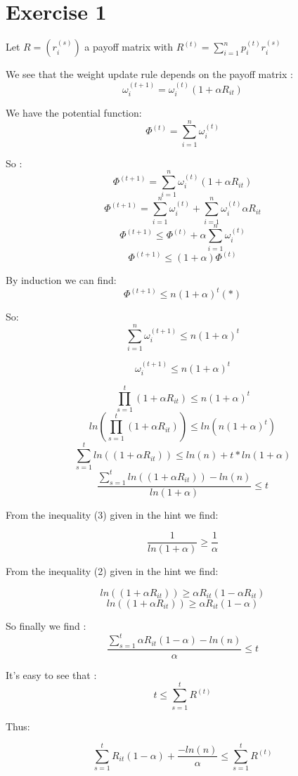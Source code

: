 \section*{Exercise 1}
Let $R=(r_{i}^{(s)})$ a payoff matrix with $R^{(t)}=\sum_{i=1}^{n}p_{i}^{(t)}r_{i}^{(s)}$

We see that the weight update rule depends on the payoff matrix :
\[\omega_{i}^{(t+1)}=\omega_{i}^{(t)}(1+\alpha R_{it})\]

We have the potential function: 
\[\Phi^{(t)}=\sum_{i=1}^{n}\omega _{i}^{(t)}\]

So : 
\[\Phi^{(t+1)}=\sum_{i=1}^{n}\omega _{i}^{(t)}(1+\alpha R_{it})\]
\[\Phi^{(t+1)}=\sum_{i=1}^{n}\omega _{i}^{(t)}+\sum_{i=1}^{n}\omega _{i}^{(t)}\alpha R_{it}\]
\[\Phi^{(t+1)}\leqslant \Phi^{(t)}+\alpha \sum_{i=1}^{n}\omega _{i}^{(t)}\]
\[\Phi^{(t+1)}\leqslant (1+\alpha )\Phi^{(t)}\]

By induction we can find:
\[\Phi^{(t+1)}\leqslant n(1+\alpha )^{t} \left ( * \right )\]


So:
\[\sum_{i=1}^{n}\omega _{i}^{(t+1)}\leqslant n(1+\alpha )^{t}\]

\[\omega _{i}^{(t+1)}\leqslant n(1+\alpha )^{t}\]

\[\prod_{s=1}^{t}(1+\alpha R_{it})\leqslant n(1+\alpha )^{t}\]
\[ln(\prod_{s=1}^{t}(1+\alpha R_{it}))\leqslant ln(n(1+\alpha )^{t})\]
\[\sum_{s=1}^{t}ln((1+\alpha R_{it}))\leqslant ln(n)+ t*ln(1+\alpha )\]
\[\frac{\sum_{s=1}^{t}ln((1+\alpha R_{it}))-ln(n)}{ln(1+\alpha)} \leqslant t\]

From the inequality (3) given in the hint we find: 

\[\frac{1}{ln(1+\alpha )}\geqslant \frac{1}{\alpha }\]

From the inequality (2) given in the hint we find: 
 
\[ln((1+\alpha R_{it}))\geqslant \alpha R_{it}(1-\alpha R_{it})\]
\[ln((1+\alpha R_{it}))\geqslant \alpha R_{it}(1-\alpha )\]

So finally we find :
\[\frac{\sum_{s=1}^{t}\alpha R_{it}(1-\alpha )-ln(n)}{\alpha} \leqslant t\]

It's easy to see that : 
\[t\leqslant \sum_{s=1}^{t}R^{(t)}\]

Thus:

\[\sum_{s=1}^{t} R_{it}(1-\alpha)+\frac{-ln(n)}{\alpha}  \leqslant \sum_{s=1}^{t}R^{(t)}\]